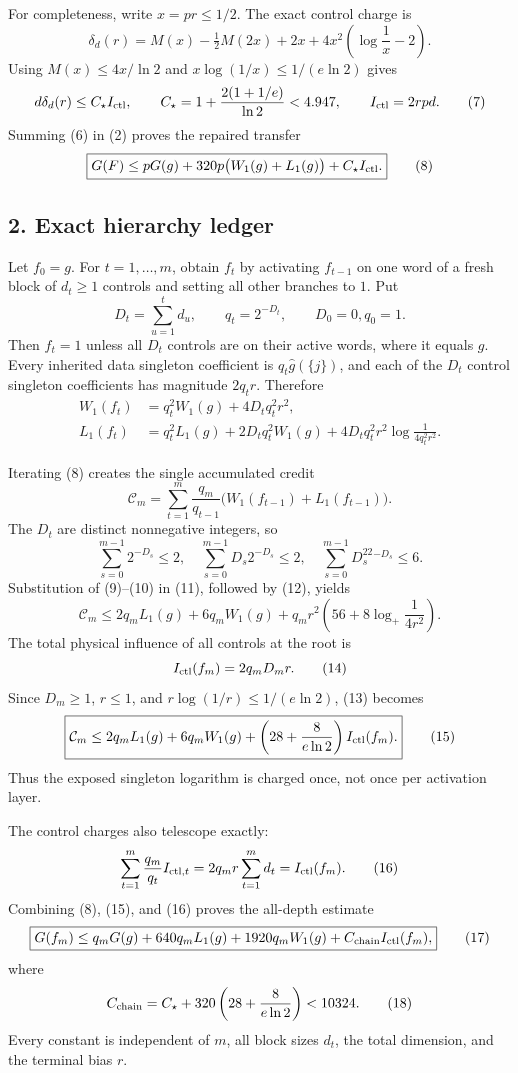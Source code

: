 For completeness, write $x=pr\leq1/2$.  The exact control charge is
\[
 \delta_d(r)=M(x)-\tfrac12M(2x)+2x
 +4x^2\left(\log\frac1x-2\right).
\]
Using $M(x)\leq4x/\ln2$ and
$x\log(1/x)\leq1/(e\ln2)$ gives
\[
 d\delta_d(r)\leq C_\star I_{\rm ctl},\qquad
 C_\star=1+\frac{2(1+1/e)}{\ln2}<4.947,
 \qquad I_{\rm ctl}=2rpd.
\tag{7}
\]
Summing (6) in (2) proves the repaired transfer
\[
 \boxed{G(F)\leq pG(g)+320p\bigl(W_1(g)+L_1(g)\bigr)
       +C_\star I_{\rm ctl}.}
\tag{8}
\]

\subsection*{2. Exact hierarchy ledger}

Let $f_0=g$.  For $t=1,\dots,m$, obtain $f_t$ by activating
$f_{t-1}$ on one word of a fresh block of $d_t\geq1$ controls and setting
all other branches to $1$.  Put
\[
 D_t=\sum_{u=1}^td_u,\qquad q_t=2^{-D_t},\qquad D_0=0, q_0=1.
\]
Then $f_t=1$ unless all $D_t$ controls are on their active words, where
it equals $g$.  Every inherited data singleton coefficient is
$q_t\widehat g(\{j\})$, and each of the $D_t$ control singleton
coefficients has magnitude $2q_tr$.  Therefore
\begin{align}
 W_1(f_t)&=q_t^2W_1(g)+4D_tq_t^2r^2,\tag{9}\\
 L_1(f_t)&=q_t^2L_1(g)+2D_tq_t^2W_1(g)
 +4D_tq_t^2r^2\log\frac1{4q_t^2r^2}.\tag{10}
\end{align}

Iterating (8) creates the single accumulated credit
\[
 \mathcal C_m=\sum_{t=1}^m\frac{q_m}{q_{t-1}}
 \bigl(W_1(f_{t-1})+L_1(f_{t-1})\bigr).
\tag{11}
\]
The $D_t$ are distinct nonnegative integers, so
\[
 \sum_{s=0}^{m-1}2^{-D_s}\leq2,\quad
 \sum_{s=0}^{m-1}D_s2^{-D_s}\leq2,\quad
 \sum_{s=0}^{m-1}D_s^22^{-D_s}\leq6.
\tag{12}
\]
Substitution of (9)--(10) in (11), followed by (12), yields
\[
 \mathcal C_m\leq2q_mL_1(g)+6q_mW_1(g)
 +q_mr^2\left(56+8\log_+\frac1{4r^2}\right).
\tag{13}
\]
The total physical influence of all controls at the root is
\[
 I_{\rm ctl}(f_m)=2q_mD_mr.
\tag{14}
\]
Since $D_m\geq1$, $r\leq1$, and
$r\log(1/r)\leq1/(e\ln2)$, (13) becomes
\[
 \boxed{\mathcal C_m\leq2q_mL_1(g)+6q_mW_1(g)
 +\left(28+\frac8{e\ln2}\right)I_{\rm ctl}(f_m).}
\tag{15}
\]
Thus the exposed singleton logarithm is charged once, not once per
activation layer.

The control charges also telescope exactly:
\[
 \sum_{t=1}^m\frac{q_m}{q_t}I_{{\rm ctl},t}
 =2q_mr\sum_{t=1}^md_t=I_{\rm ctl}(f_m).
\tag{16}
\]
Combining (8), (15), and (16) proves the all-depth estimate
\[
 \boxed{
 G(f_m)\leq q_mG(g)+640q_mL_1(g)+1920q_mW_1(g)
 +C_{\rm chain}I_{\rm ctl}(f_m),}
\tag{17}
\]
where
\[
 C_{\rm chain}=C_\star+320\left(28+\frac8{e\ln2}\right)
 <10324.
\tag{18}
\]
Every constant is independent of $m$, all block sizes $d_t$, the total
dimension, and the terminal bias $r$.

